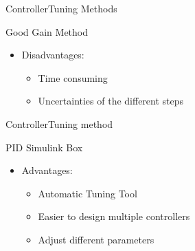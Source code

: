 \begin{frame}{Controller}{Tuning Methods}
  \begin{block}{Good Gain Method}
  
	 \begin{itemize}
	  	\item Disadvantages:
	  \begin{itemize}
	  	\item Time consuming
	  	\item Uncertainties of the different steps	  	
	  \end{itemize}
	\end{itemize}
  
  \end{block}
\end{frame}


\begin{frame}{Controller}{Tuning method}
  \begin{block}{PID Simulink Box}

	  \begin{itemize}
	  \item Advantages:
	  \begin{itemize}
	  	\item Automatic Tuning Tool
	  	\item Easier to design multiple controllers
	  	\item Adjust different parameters  	
	  \end{itemize}
	  \end{itemize}

  \end{block}
\end{frame}

